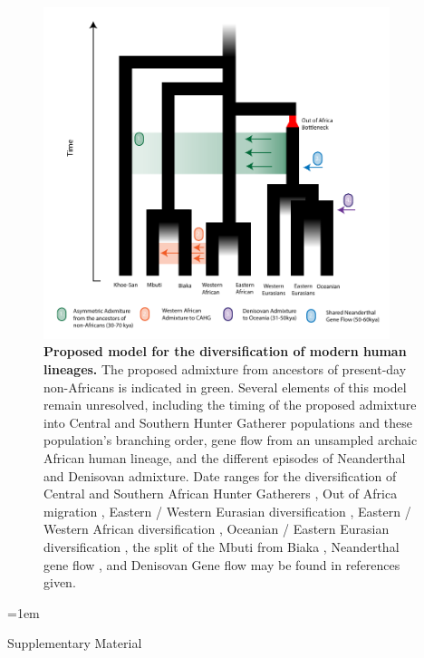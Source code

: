 \documentclass{article}
\begin{document}
\begin{figure}
    \centering
    \includegraphics[width=0.9\textwidth]{plot/simple_demography_v5.pdf}
    \caption{ {\bf Proposed model for the diversification of modern human lineages.}
    The proposed admixture from ancestors of present-day non-Africans is indicated in green.
    Several elements of this model remain unresolved, including the timing of the proposed admixture into Central and Southern Hunter Gatherer populations and these population's branching order, gene flow from an unsampled archaic African human lineage, and the different episodes of Neanderthal and Denisovan admixture. Date ranges for the diversification of Central and Southern African Hunter Gatherers \cite{Mallick2016}, Out of Africa migration \cite{Lipson2019}, Eastern / Western Eurasian diversification \cite{Schiffels2014a}, Eastern / Western African diversification \cite{Fan2019}, Oceanian / Eastern Eurasian diversification \cite{Lipson2017}, the split of the Mbuti from Biaka \cite{Mallick2016}, Neanderthal gene flow \cite{Sankararaman2012}, and Denisovan Gene flow \cite{Malaspinas2016} may be found in references given. }
    \label{fig:simple_dem}
\end{figure}

\newpage
\clearpage
\emergencystretch=1em
\printbibliography
\newpage


\begin{center}
\Large Supplementary Material
\end{center}
\end{document}
